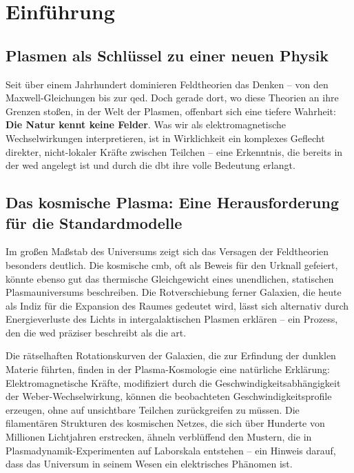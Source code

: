 \chapter{Einführung}
\section{Plasmen als Schlüssel zu einer neuen Physik}
Seit über einem Jahrhundert dominieren Feldtheorien das Denken – von den Maxwell-Gleichungen bis zur \gls{qed}. Doch gerade dort, wo diese Theorien an ihre Grenzen stoßen, in der
Welt der Plasmen, offenbart sich eine tiefere Wahrheit: \textbf{Die Natur kennt keine Felder}. Was wir als elektromagnetische Wechselwirkungen interpretieren, ist in Wirklichkeit ein
komplexes Geflecht direkter, nicht-lokaler Kräfte zwischen Teilchen – eine Erkenntnis, die bereits in der \gls{wed} angelegt ist und durch die \gls{dbt} ihre volle
Bedeutung erlangt.

\section{Das kosmische Plasma: Eine Herausforderung für die Standardmodelle}
Im großen Maßstab des Universums zeigt sich das Versagen der Feldtheorien besonders deutlich. Die kosmische \gls{cmb}, oft als Beweis für den Urknall gefeiert, könnte
ebenso gut das thermische Gleichgewicht eines unendlichen, statischen Plasmauniversums beschreiben. Die Rotverschiebung ferner Galaxien, die heute als Indiz für die Expansion des
Raumes gedeutet wird, lässt sich alternativ durch Energieverluste des Lichts in intergalaktischen Plasmen erklären – ein Prozess, den die \gls{wed} präziser beschreibt
als die \gls{art}.

Die rätselhaften Rotationskurven der Galaxien, die zur Erfindung der dunklen Materie führten, finden in der Plasma-Kosmologie eine natürliche Erklärung: Elektromagnetische Kräfte,
modifiziert durch die Geschwindigkeitsabhängigkeit der Weber-Wechselwirkung, können die beobachteten Geschwindigkeitsprofile erzeugen, ohne auf unsichtbare Teilchen zurückgreifen
zu müssen. Die filamentären Strukturen des kosmischen Netzes, die sich über Hunderte von Millionen Lichtjahren erstrecken, ähneln verblüffend den Mustern, die in
Plasmadynamik-Experimenten auf Laborskala entstehen – ein Hinweis darauf, dass das Universum in seinem Wesen ein elektrisches Phänomen ist.

